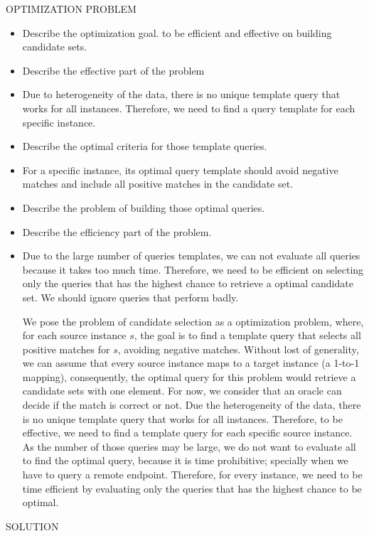 OPTIMIZATION PROBLEM
\begin{itemize}
\item Describe the optimization goal. to be efficient and effective on building candidate sets.
\item Describe the effective part of the problem
\item Due to heterogeneity of the data, there is no unique template query that works for all instances. Therefore, we need to find a query template for each specific instance. 
\item Describe the optimal criteria for those template queries. 
\item For a specific instance, its optimal query template should avoid negative matches and include all positive matches in the candidate set. 
\item Describe the problem of building those optimal queries.
\item Describe the efficiency part of the problem. 
\item Due to the large number of queries templates, we can not evaluate all queries because it takes too much time. Therefore, we need to be efficient on selecting only the queries that has the highest chance to retrieve a optimal candidate set. We should ignore queries that perform badly.

We pose the problem of candidate selection as a optimization problem, where, for each source instance $s$, the goal is to find a template query that selects all positive matches for $s$, avoiding negative matches. Without lost of generality, we can assume that every source instance maps to a target instance (a 1-to-1 mapping), consequently, the optimal query for this problem would retrieve a candidate sets with one element. For now, we consider that an oracle can decide if the match is correct or not. Due the heterogeneity of the data, there is no unique template query that works for all instances. Therefore, to be effective, we need to find a template query for each specific source instance.  As the number of those queries may be large, we do not want to evaluate all to find the optimal query, because it is time prohibitive; specially when we have to query a remote endpoint. Therefore, for every instance, we need to be time efficient by evaluating only the queries that has the highest chance to be optimal.
\end{itemize}



SOLUTION

